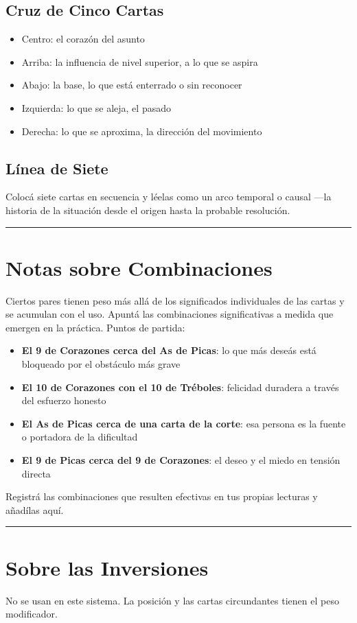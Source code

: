 \subsection{Cruz de Cinco Cartas}\label{five-card-cross}

\begin{itemize}
\tightlist
\item
  Centro: el corazón del asunto
\item
  Arriba: la influencia de nivel superior, a lo que se aspira
\item
  Abajo: la base, lo que está enterrado o sin reconocer
\item
  Izquierda: lo que se aleja, el pasado
\item
  Derecha: lo que se aproxima, la dirección del movimiento
\end{itemize}

\subsection{Línea de Siete}\label{line-of-seven}

Colocá siete cartas en secuencia y léelas como un arco temporal o causal ---la historia de la situación desde el origen hasta la probable resolución.

\begin{center}\rule{0.5\linewidth}{0.5pt}\end{center}

\section{Notas sobre Combinaciones}\label{notes-on-combinations}

Ciertos pares tienen peso más allá de los significados individuales de las cartas y se acumulan con el uso. Apuntá las combinaciones significativas a medida que emergen en la práctica. Puntos de partida:

\begin{itemize}
\tightlist
\item
  \textbf{El 9 de Corazones cerca del As de Picas}: lo que más deseás está bloqueado por el obstáculo más grave
\item
  \textbf{El 10 de Corazones con el 10 de Tréboles}: felicidad duradera a través del esfuerzo honesto
\item
  \textbf{El As de Picas cerca de una carta de la corte}: esa persona es la fuente o portadora de la dificultad
\item
  \textbf{El 9 de Picas cerca del 9 de Corazones}: el deseo y el miedo en tensión directa
\end{itemize}

Registrá las combinaciones que resulten efectivas en tus propias lecturas y añadílas aquí.

\begin{center}\rule{0.5\linewidth}{0.5pt}\end{center}

\section{Sobre las Inversiones}\label{on-reversals}

No se usan en este sistema. La posición y las cartas circundantes tienen el peso modificador.
